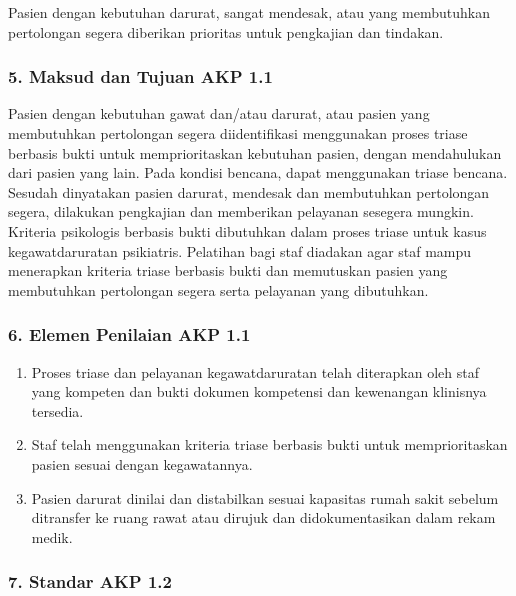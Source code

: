 \documentclass[
]{book}
\providecommand{\tightlist}{%
  \setlength{\itemsep}{0pt}\setlength{\parskip}{0pt}}
\begin{document}
Pasien dengan kebutuhan darurat, sangat mendesak, atau yang membutuhkan pertolongan segera diberikan prioritas untuk pengkajian dan tindakan.

\hypertarget{maksud-dan-tujuan-akp-1.1}{%
\subsubsection*{5. Maksud dan Tujuan AKP 1.1}\label{maksud-dan-tujuan-akp-1.1}}

Pasien dengan kebutuhan gawat dan/atau darurat, atau pasien yang membutuhkan pertolongan segera diidentifikasi menggunakan proses triase berbasis bukti untuk memprioritaskan kebutuhan pasien, dengan mendahulukan dari pasien yang lain. Pada kondisi bencana, dapat menggunakan triase bencana. Sesudah dinyatakan pasien darurat, mendesak dan membutuhkan pertolongan segera, dilakukan pengkajian dan memberikan pelayanan sesegera mungkin. Kriteria psikologis berbasis bukti dibutuhkan dalam proses triase untuk kasus kegawatdaruratan psikiatris. Pelatihan bagi staf diadakan agar staf mampu menerapkan kriteria triase berbasis bukti dan memutuskan pasien yang membutuhkan pertolongan segera serta pelayanan yang dibutuhkan.

\hypertarget{elemen-penilaian-akp-1.1}{%
\subsubsection*{6. Elemen Penilaian AKP 1.1}\label{elemen-penilaian-akp-1.1}}

\begin{enumerate}
\def\labelenumi{\alph{enumi}.}
\tightlist
\item
  Proses triase dan pelayanan kegawatdaruratan telah diterapkan oleh staf yang kompeten dan bukti dokumen kompetensi dan kewenangan klinisnya tersedia.
\item
  Staf telah menggunakan kriteria triase berbasis bukti untuk memprioritaskan pasien sesuai dengan kegawatannya.
\item
  Pasien darurat dinilai dan distabilkan sesuai kapasitas rumah sakit sebelum ditransfer ke ruang rawat atau dirujuk dan didokumentasikan dalam rekam medik.
\end{enumerate}

\hypertarget{standar-akp-1.2}{%
\subsubsection*{7. Standar AKP 1.2}\label{standar-akp-1.2}}
\end{document}
